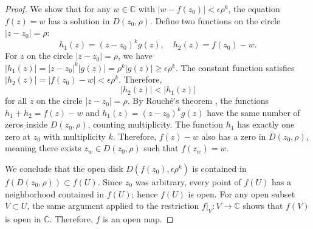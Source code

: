\begin{proof}
We show that for any $w \in \mathbb{C}$ with $|w - f(z_0)| < \epsilon \rho^k$, the equation $f(z) = w$ has a solution in $D(z_0, \rho)$. Define two functions on the circle $|z - z_0| = \rho$:
$$h_1(z) = (z - z_0)^k g(z), \quad h_2(z) = f(z_0) - w.$$
For $z$ on the circle $|z - z_0| = \rho$, we have $|h_1(z)| = |z - z_0|^k |g(z)| = \rho^k |g(z)| \geq \epsilon \rho^k$. The constant function satisfies $|h_2(z)| = |f(z_0) - w| < \epsilon \rho^k$. Therefore,
$$|h_2(z)| < |h_1(z)|$$
for all $z$ on the circle $|z - z_0| = \rho$. By Rouché's theorem , the functions $h_1 + h_2 = f(z) - w$ and $h_1(z) = (z - z_0)^k g(z)$ have the same number of zeros inside $D(z_0, \rho)$, counting multiplicity. The function $h_1$ has exactly one zero at $z_0$ with multiplicity $k$. Therefore, $f(z) - w$ also has a zero in $D(z_0, \rho)$, meaning there exists $z_w \in D(z_0, \rho)$ such that $f(z_w) = w$.

We conclude that the open disk $D(f(z_0), \epsilon \rho^k)$ is contained in $f(D(z_0, \rho)) \subset f(U)$. Since $z_0$ was arbitrary, every point of $f(U)$ has a neighborhood contained in $f(U)$; hence $f(U)$ is open. For any open subset $V \subset U$, the same argument applied to the restriction $f|_V : V \to \mathbb{C}$ shows that $f(V)$ is open in $\mathbb{C}$. Therefore, $f$ is an open map.
\end{proof}
